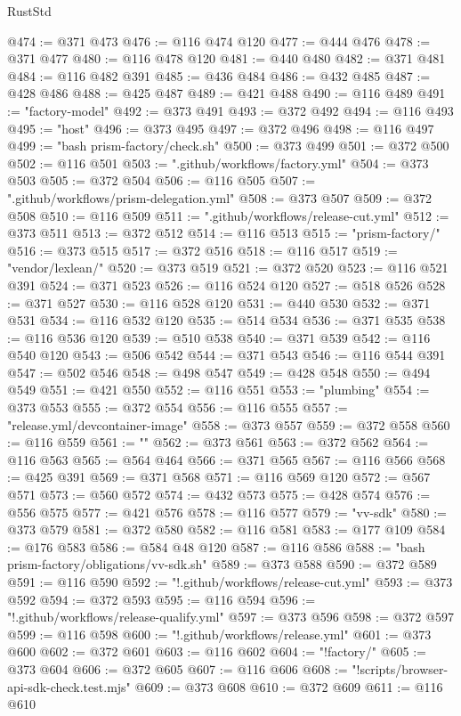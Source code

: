 \begin{lexlean}{RustStd}
\begin{coremodule}
@474 := @371 @473
@476 := @116 @474 @120
@477 := @444 @476
@478 := @371 @477
@480 := @116 @478 @120
@481 := @440 @480
@482 := @371 @481
@484 := @116 @482 @391
@485 := @436 @484
@486 := @432 @485
@487 := @428 @486
@488 := @425 @487
@489 := @421 @488
@490 := @116 @489
@491 := "factory-model"
@492 := @373 @491
@493 := @372 @492
@494 := @116 @493
@495 := "host"
@496 := @373 @495
@497 := @372 @496
@498 := @116 @497
@499 := "bash prism-factory/check.sh"
@500 := @373 @499
@501 := @372 @500
@502 := @116 @501
@503 := ".github/workflows/factory.yml"
@504 := @373 @503
@505 := @372 @504
@506 := @116 @505
@507 := ".github/workflows/prism-delegation.yml"
@508 := @373 @507
@509 := @372 @508
@510 := @116 @509
@511 := ".github/workflows/release-cut.yml"
@512 := @373 @511
@513 := @372 @512
@514 := @116 @513
@515 := "prism-factory/"
@516 := @373 @515
@517 := @372 @516
@518 := @116 @517
@519 := "vendor/lexlean/"
@520 := @373 @519
@521 := @372 @520
@523 := @116 @521 @391
@524 := @371 @523
@526 := @116 @524 @120
@527 := @518 @526
@528 := @371 @527
@530 := @116 @528 @120
@531 := @440 @530
@532 := @371 @531
@534 := @116 @532 @120
@535 := @514 @534
@536 := @371 @535
@538 := @116 @536 @120
@539 := @510 @538
@540 := @371 @539
@542 := @116 @540 @120
@543 := @506 @542
@544 := @371 @543
@546 := @116 @544 @391
@547 := @502 @546
@548 := @498 @547
@549 := @428 @548
@550 := @494 @549
@551 := @421 @550
@552 := @116 @551
@553 := "plumbing"
@554 := @373 @553
@555 := @372 @554
@556 := @116 @555
@557 := "release.yml/devcontainer-image"
@558 := @373 @557
@559 := @372 @558
@560 := @116 @559
@561 := ""
@562 := @373 @561
@563 := @372 @562
@564 := @116 @563
@565 := @564 @464
@566 := @371 @565
@567 := @116 @566
@568 := @425 @391
@569 := @371 @568
@571 := @116 @569 @120
@572 := @567 @571
@573 := @560 @572
@574 := @432 @573
@575 := @428 @574
@576 := @556 @575
@577 := @421 @576
@578 := @116 @577
@579 := "vv-sdk"
@580 := @373 @579
@581 := @372 @580
@582 := @116 @581
@583 := @177 @109
@584 := @176 @583
@586 := @584 @48 @120
@587 := @116 @586
@588 := "bash prism-factory/obligations/vv-sdk.sh"
@589 := @373 @588
@590 := @372 @589
@591 := @116 @590
@592 := "!.github/workflows/release-cut.yml"
@593 := @373 @592
@594 := @372 @593
@595 := @116 @594
@596 := "!.github/workflows/release-qualify.yml"
@597 := @373 @596
@598 := @372 @597
@599 := @116 @598
@600 := "!.github/workflows/release.yml"
@601 := @373 @600
@602 := @372 @601
@603 := @116 @602
@604 := "!factory/"
@605 := @373 @604
@606 := @372 @605
@607 := @116 @606
@608 := "!scripts/browser-api-sdk-check.test.mjs"
@609 := @373 @608
@610 := @372 @609
@611 := @116 @610

\end{coremodule}
\end{lexlean}

